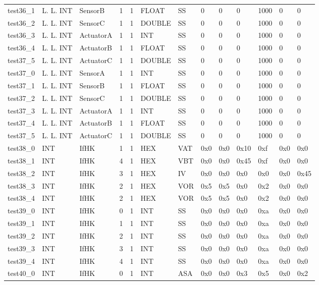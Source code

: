 \begin{longtable}{|l|l|l|p{0.5cm}|p{0.5cm}|l|p{0.5cm}|p{0.5cm}|p{0.5cm}|l|l|p{0.5cm}|l|}
test36\_1 & L. L. INT & SensorB & 1 & 1 & FLOAT & SS & 0 & 0 & 0 & 1000 & 0 & 0 \\
test36\_2 & L. L. INT & SensorC & 1 & 1 & DOUBLE & SS & 0 & 0 & 0 & 1000 & 0 & 0 \\
test36\_3 & L. L. INT & ActuatorA & 1 & 1 & INT & SS & 0 & 0 & 0 & 1000 & 0 & 0 \\
test36\_4 & L. L. INT & ActuatorB & 1 & 1 & FLOAT & SS & 0 & 0 & 0 & 1000 & 0 & 0 \\
test37\_5 & L. L. INT & ActuatorC & 1 & 1 & DOUBLE & SS & 0 & 0 & 0 & 1000 & 0 & 0 \\
test37\_0 & L. L. INT & SensorA & 1 & 1 & INT & SS & 0 & 0 & 0 & 1000 & 0 & 0 \\
test37\_1 & L. L. INT & SensorB & 1 & 1 & FLOAT & SS & 0 & 0 & 0 & 1000 & 0 & 0 \\
test37\_2 & L. L. INT & SensorC & 1 & 1 & DOUBLE & SS & 0 & 0 & 0 & 1000 & 0 & 0 \\
test37\_3 & L. L. INT & ActuatorA & 1 & 1 & INT & SS & 0 & 0 & 0 & 1000 & 0 & 0 \\
test37\_4 & L. L. INT & ActuatorB & 1 & 1 & FLOAT & SS & 0 & 0 & 0 & 1000 & 0 & 0 \\
test37\_5 & L. L. INT & ActuatorC & 1 & 1 & DOUBLE & SS & 0 & 0 & 0 & 1000 & 0 & 0 \\
test38\_0 & INT & IfHK & 1 & 1 & HEX & VAT & 0x0 & 0x0 & 0x10 & 0xf & 0x0 & 0x0 \\
test38\_1 & INT & IfHK & 4 & 1 & HEX & VBT & 0x0 & 0x0 & 0x45 & 0xf & 0x0 & 0x0 \\
test38\_2 & INT & IfHK & 3 & 1 & HEX & IV & 0x0 & 0x0 & 0x0 & 0x0 & 0x0 & 0x45 \\
test38\_3 & INT & IfHK & 2 & 1 & HEX & VOR & 0x5 & 0x5 & 0x0 & 0x2 & 0x0 & 0x0 \\
test38\_4 & INT & IfHK & 2 & 1 & HEX & VOR & 0x5 & 0x5 & 0x0 & 0x2 & 0x0 & 0x0 \\
test39\_0 & INT & IfHK & 0 & 1 & INT & SS & 0x0 & 0x0 & 0x0 & 0xa & 0x0 & 0x0 \\
test39\_1 & INT & IfHK & 1 & 1 & INT & SS & 0x0 & 0x0 & 0x0 & 0xa & 0x0 & 0x0 \\
test39\_2 & INT & IfHK & 2 & 1 & INT & SS & 0x0 & 0x0 & 0x0 & 0xa & 0x0 & 0x0 \\
test39\_3 & INT & IfHK & 3 & 1 & INT & SS & 0x0 & 0x0 & 0x0 & 0xa & 0x0 & 0x0 \\
test39\_4 & INT & IfHK & 4 & 1 & INT & SS & 0x0 & 0x0 & 0x0 & 0xa & 0x0 & 0x0 \\
test40\_0 & INT & IfHK & 0 & 1 & INT & ASA & 0x0 & 0x0 & 0x3 & 0x5 & 0x0 & 0x2 \\

\end{longtable}

